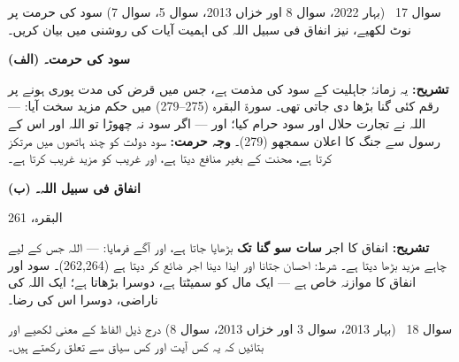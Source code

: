 \begin{sawal}{سوال \textenglish{17} \ \textnormal{\small(بہار \textenglish{2022}، سوال \textenglish{8} اور خزاں \textenglish{2013}، سوال \textenglish{5}، سوال \textenglish{7})}}
سود کی حرمت پر نوٹ لکھیے، نیز انفاق فی سبیل اللہ کی اہمیت آیات کی روشنی میں
بیان کریں۔
\end{sawal}

\begin{hal}
\textbf{(الف) سود کی حرمت۔}


\smallskip
\textbf{تشریح:} یہ زمانۂ جاہلیت کے سود کی مذمت ہے، جس میں قرض کی مدت پوری
ہونے پر رقم کئی گنا بڑھا دی جاتی تھی۔ سورۃ البقرہ (\textenglish{275--279})
میں حکم مزید سخت آیا: 
--- اللہ نے تجارت حلال اور سود حرام کیا؛ اور  --- اگر سود نہ چھوڑا تو اللہ
اور اس کے رسول سے جنگ کا اعلان سمجھو (\textenglish{279})۔ \textbf{وجہ حرمت:}
سود دولت کو چند ہاتھوں میں مرتکز کرتا ہے، محنت کے بغیر منافع دیتا ہے، اور
غریب کو مزید غریب کرتا ہے۔

\medskip
\textbf{(ب) انفاق فی سبیل اللہ۔}

{البقرہ، \textenglish{261}}

\smallskip
\textbf{تشریح:} انفاق کا اجر \textbf{سات سو گنا تک} بڑھایا جاتا ہے، اور آگے
فرمایا:  --- اللہ جس کے لیے چاہے مزید
بڑھا دیتا ہے۔ شرط: احسان جتانا اور ایذا دینا اجر ضائع کر دیتا ہے
(\textenglish{262,264})۔ سود اور انفاق کا موازنہ خاص ہے --- ایک مال کو
سمیٹتا ہے، دوسرا بڑھاتا ہے؛ ایک اللہ کی ناراضی، دوسرا اس کی رضا۔
\end{hal}

\begin{sawal}{سوال \textenglish{18} \ \textnormal{\small(بہار \textenglish{2013}، سوال \textenglish{3} اور خزاں \textenglish{2013}، سوال \textenglish{8})}}
درج ذیل الفاظ کے معنی لکھیے اور بتائیں کہ یہ کس آیت اور کس سیاق سے تعلق
رکھتے ہیں۔
\end{sawal}

